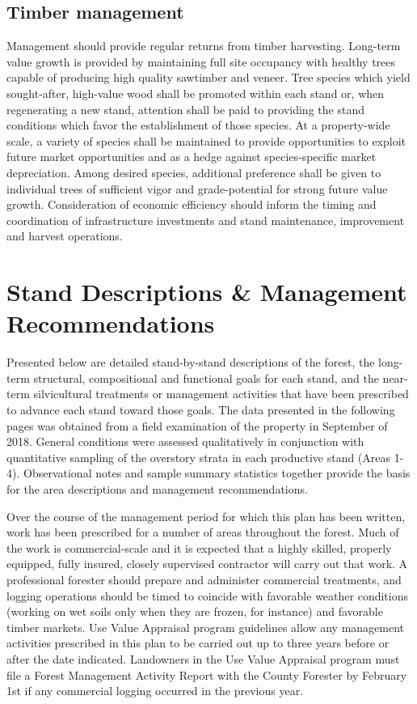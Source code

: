 \documentclass[]{tufte-handout}
\begin{document}
\subsection{Timber management}\label{timber-management}

Management should provide regular returns from timber harvesting.
Long-term value growth is provided by maintaining full site occupancy
with healthy trees capable of producing high quality sawtimber and
veneer. Tree species which yield sought-after, high-value wood shall be
promoted within each stand or, when regenerating a new stand, attention
shall be paid to providing the stand conditions which favor the
establishment of those species. At a property-wide scale, a variety of
species shall be maintained to provide opportunities to exploit future
market opportunities and as a hedge against species-specific market
depreciation. Among desired species, additional preference shall be
given to individual trees of sufficient vigor and grade-potential for
strong future value growth. Consideration of economic efficiency should
inform the timing and coordination of infrastructure investments and
stand maintenance, improvement and harvest operations.

\section{Stand Descriptions \& Management
Recommendations}\label{stand-descriptions-management-recommendations}

Presented below are detailed stand-by-stand descriptions of the forest,
the long-term structural, compositional and functional goals for each
stand, and the near-term silvicultural treatments or management
activities that have been prescribed to advance each stand toward those
goals. The data presented in the following pages was obtained from a
field examination of the property in September of 2018. General
conditions were assessed qualitatively in conjunction with quantitative
sampling of the overstory strata in each productive stand (Areas 1-4).
Observational notes and sample summary statistics together provide the
basis for the area descriptions and management recommendations.

Over the course of the management period for which this plan has been
written, work has been prescribed for a number of areas throughout the
forest. Much of the work is commercial-scale and it is expected that a
highly skilled, properly equipped, fully insured, closely supervised
contractor will carry out that work. A professional forester should
prepare and administer commercial treatments, and logging operations
should be timed to coincide with favorable weather conditions (working
on wet soils only when they are frozen, for instance) and favorable
timber markets. Use Value Appraisal program guidelines allow any
management activities prescribed in this plan to be carried out up to
three years before or after the date indicated. Landowners in the Use
Value Appraisal program must file a Forest Management Activity Report
with the County Forester by February 1st if any commercial logging
occurred in the previous year.
\end{document}
